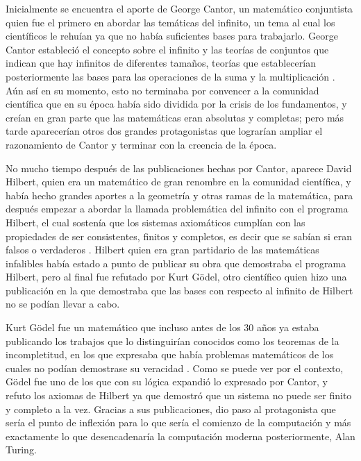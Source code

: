 \documentclass[12pt, letter]{article}
\begin{document}
\setlength{\parindent}{31pt}
Inicialmente se encuentra el aporte de George Cantor, un matemático conjuntista quien fue el primero en abordar las temáticas del infinito, un tema al cual los científicos le rehuían ya que no había suficientes bases para trabajarlo. George Cantor estableció el concepto sobre el infinito y las teorías de conjuntos que indican que hay infinitos de diferentes tamaños, teorías que establecerían posteriormente las bases para las operaciones de la suma y la multiplicación \parencite{Cantor}. Aún así en su momento, esto no terminaba por convencer a la comunidad científica que en su época había sido dividida por la crisis de los fundamentos, y creían en gran parte que las matemáticas eran absolutas y completas; pero más tarde aparecerían otros dos grandes protagonistas que lograrían ampliar el razonamiento de Cantor y terminar con la creencia de la época.

\setlength{\parindent}{31pt}
No mucho tiempo después de las publicaciones hechas por Cantor, aparece David Hilbert, quien era un matemático de gran renombre en la comunidad científica, y había hecho grandes aportes a la geometría y otras ramas de la matemática, para después empezar a abordar la llamada problemática del infinito con el programa Hilbert, el cual sostenía que los sistemas axiomáticos cumplían con las propiedades de ser consistentes, finitos y completos, es decir que se sabían si eran falsos o verdaderos \parencite{Hilbert1, Hilbert2}. Hilbert quien era gran partidario de las matemáticas infalibles había estado a punto de publicar su obra que demostraba el programa Hilbert, pero al final fue refutado por Kurt Gödel, otro científico quien hizo una publicación en la que demostraba que las bases con respecto al infinito de Hilbert no se podían llevar a cabo.

\setlength{\parindent}{31pt}
Kurt Gödel fue un matemático que incluso antes de los 30 años ya estaba publicando los trabajos que lo distinguirían conocidos como los teoremas de la incompletitud, en los que expresaba que había problemas matemáticos de los cuales no podían demostrase su veracidad
\parencite{KurtG1,KurtG2}. Como se puede ver por el contexto, Gödel fue uno de los que con su lógica expandió lo expresado por Cantor, y refuto los axiomas de Hilbert ya que demostró que un sistema no puede ser finito y completo a la vez. Gracias a sus publicaciones, dio paso al protagonista que sería el punto de inflexión para lo que sería el comienzo de la computación y más exactamente lo que desencadenaría la computación moderna posteriormente, Alan Turing.
\end{document}

